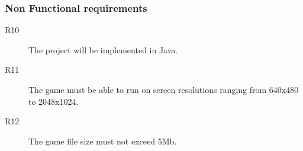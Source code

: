 \documentclass[10pt, handout]{beamer}
\begin{document}
\begin{frame}[shrink]
  \frametitle{Non Functional requirements}
  \begin{description}
    \item[R10] The project will be implemented in Java.
    \item[R11] The game must be able to run on screen resolutions
      ranging from 640x480 to 2048x1024.
    \item[R12] The game file size must not exceed 5Mb.
  \end{description}
\end{frame}
\end{document}
